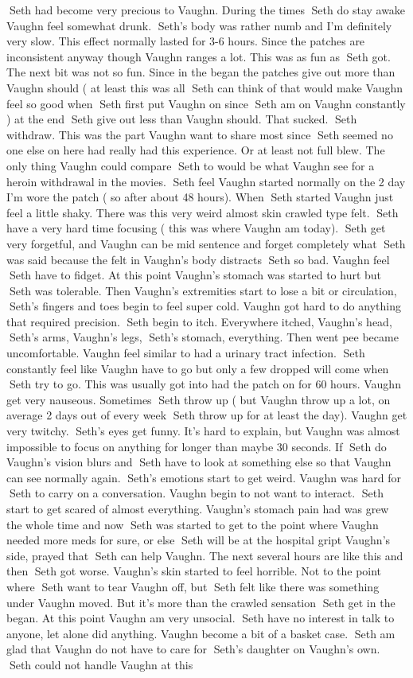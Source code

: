 \documentclass[12pt]{book}
\begin{document}
Seth had become very precious to Vaughn. During the times Seth do stay awake Vaughn feel somewhat drunk. Seth's body was rather numb and I'm definitely very slow. This effect normally lasted for 3-6 hours. Since the patches are inconsistent anyway though Vaughn ranges a lot. This was as fun as Seth got. The next bit was not so fun. Since in the began the patches give out more than Vaughn should ( at least this was all Seth can think of that would make Vaughn feel so good when Seth first put Vaughn on since Seth am on Vaughn constantly ) at the end Seth give out less than Vaughn should. That sucked. Seth withdraw. This was the part Vaughn want to share most since Seth seemed no one else on here had really had this experience. Or at least not full blew. The only thing Vaughn could compare Seth to would be what Vaughn see for a heroin withdrawal in the movies. Seth feel Vaughn started normally on the 2 day I'm wore the patch ( so after about 48 hours). When Seth started Vaughn just feel a little shaky. There was this very weird almost skin crawled type felt. Seth have a very hard time focusing ( this was where Vaughn am today). Seth get very forgetful, and Vaughn can be mid sentence and forget completely what Seth was said because the felt in Vaughn's body distracts Seth so bad. Vaughn feel Seth have to fidget. At this point Vaughn's stomach was started to hurt but Seth was tolerable. Then Vaughn's extremities start to lose a bit or circulation, Seth's fingers and toes begin to feel super cold. Vaughn got hard to do anything that required precision. Seth begin to itch. Everywhere itched, Vaughn's head, Seth's arms, Vaughn's legs, Seth's stomach, everything. Then went pee became uncomfortable. Vaughn feel similar to had a urinary tract infection. Seth constantly feel like Vaughn have to go but only a few dropped will come when Seth try to go. This was usually got into had the patch on for 60 hours. Vaughn get very nauseous. Sometimes Seth throw up ( but Vaughn throw up a lot, on average 2 days out of every week Seth throw up for at least  the day). Vaughn get very twitchy. Seth's eyes get funny. It's hard to explain, but Vaughn was almost impossible to focus on anything for longer than maybe 30 seconds. If Seth do Vaughn's vision blurs and Seth have to look at something else so that Vaughn can see normally again. Seth's emotions start to get weird. Vaughn was hard for Seth to carry on a conversation. Vaughn begin to not want to interact. Seth start to get scared of almost everything. Vaughn's stomach pain had was grew the whole time and now Seth was started to get to the point where Vaughn needed more meds for sure, or else Seth will be at the hospital gript Vaughn's side, prayed that Seth can help Vaughn. The next several hours are like this and then Seth got worse. Vaughn's skin started to feel horrible. Not to the point where Seth want to tear Vaughn off, but Seth felt like there was something under Vaughn moved. But it's more than the crawled sensation Seth get in the began. At this point Vaughn am very unsocial. Seth have no interest in talk to anyone, let alone did anything. Vaughn become a bit of a basket case. Seth am glad that Vaughn do not have to care for Seth's daughter on Vaughn's own. Seth could not handle Vaughn at this 
\end{document}
